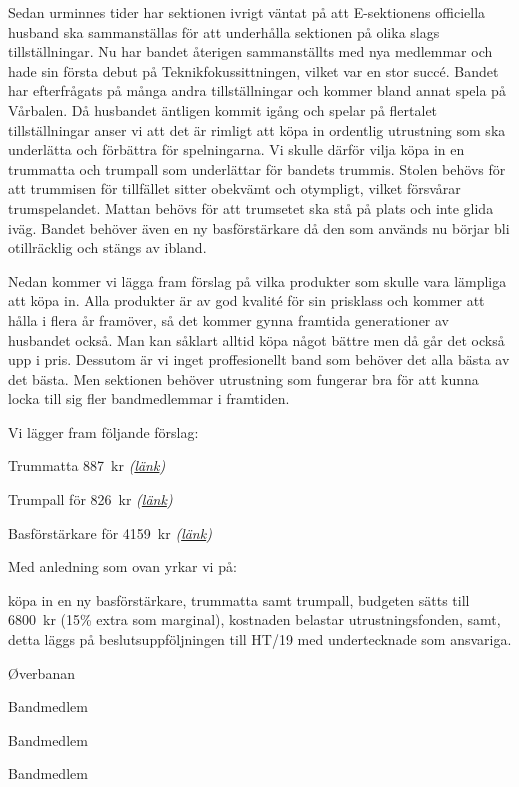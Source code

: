 \documentclass[../_main/handlingar.tex]{subfiles}
\begin{document}

Sedan urminnes tider har sektionen ivrigt väntat på att E-sektionens officiella husband ska sammanställas för att underhålla sektionen på olika slags tillställningar. Nu har bandet återigen sammanställts med nya medlemmar och hade sin första debut på Teknikfokussittningen, vilket var en stor succé. Bandet har efterfrågats på många andra tillställningar och kommer bland annat spela på Vårbalen. 
Då husbandet äntligen kommit igång och spelar på flertalet tillställningar anser vi att det är rimligt att köpa in ordentlig utrustning som ska underlätta och förbättra för spelningarna.  Vi skulle därför vilja köpa in en trummatta och trumpall som underlättar för bandets trummis. Stolen behövs för att trummisen för tillfället sitter obekvämt och otympligt, vilket försvårar trumspelandet. Mattan behövs för att trumsetet ska stå på plats och inte glida iväg. Bandet behöver även en ny basförstärkare då den som används nu börjar bli otillräcklig och stängs av ibland.\newline

Nedan kommer vi lägga fram förslag på vilka produkter som skulle vara lämpliga att köpa in. Alla produkter är av god kvalité för sin prisklass och kommer att hålla i flera år framöver, så det kommer gynna framtida generationer av husbandet också. Man kan såklart alltid köpa något bättre men då går det också upp i pris. Dessutom är vi inget proffesionellt band som behöver det alla bästa av det bästa. Men sektionen behöver utrustning som fungerar bra för att kunna locka till sig fler bandmedlemmar i framtiden.\newline

Vi lägger fram följande förslag:
\begin{dashlist}
    \item Trummatta \SI{887}{kr} \textit{(\href{https://www.thomann.de/se/meinl_mdr_or_oriental_drum_rug.htm?glp=1&gclid=CjwKCAjwm-fkBRBBEiwA966fZL-UsFSeI5L6Yf88U_LjaWEssJDMeWpkyfgSy1Q2b6NpAoJXO0JvPxoCjS4QAvD_BwE}{länk})}
    \item Trumpall för \SI{826}{kr} \textit{(\href{https://www.thomann.de/se/km_14010_drum_throne_piccolino.htm}{länk})}
    \item Basförstärkare för \SI{4159}{kr} \textit{(\href{https://www.thomann.de/se/ampeg_ba_115_v2.htm}{länk})}
\end{dashlist}

Med anledning som ovan yrkar vi på:
\begin{attsatser}
    \att köpa in en ny basförstärkare, trummatta samt trumpall,
    \att budgeten sätts till \SI{6800}{kr} (15\% extra som marginal),
	\att kostnaden belastar utrustningsfonden, samt,
	\att detta läggs på beslutsuppföljningen till HT/19 med undertecknade som ansvariga.
\end{attsatser}

\begin{signatures}{4}
	\mvh
	\signature{William Sjödin}{Øverbanan}
	\signature{Daniel Bakic}{Bandmedlem}
    \signature{Oskar Magnusson}{Bandmedlem}
    \signature{Valter Möller}{Bandmedlem}
\end{signatures}
\end{document}
